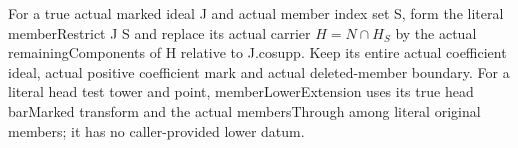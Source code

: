\begin{definition}
\label{hir:member-lower-extension-actual-global-datum}
\leanok
For a true actual marked ideal J and actual member index set S, form the literal
memberRestrict J S and replace its actual carrier $H=N\cap H_S$ by the
actual remainingComponents of H relative to J.cosupp. Keep its entire actual
coefficient ideal, actual positive coefficient mark and actual deleted-member
boundary. For a literal head test tower and point, memberLowerExtension uses
its true head barMarked transform and the actual membersThrough among literal
original members; it has no caller-provided lower datum.
\end{definition}

